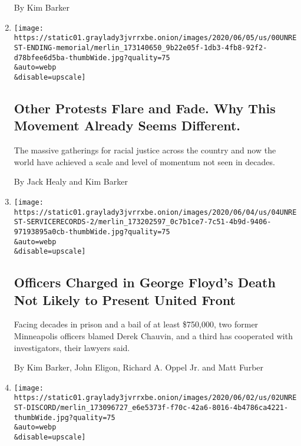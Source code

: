 \begin{enumerate}
  By Kim Barker
\item
  \href{/2020/06/07/us/unrest-protests-minneapolis-ending.html}{}

  \texttt{[image: https://static01.graylady3jvrrxbe.onion/images/2020/06/05/us/00UNREST-ENDING-memorial/merlin\_173140650\_9b22e05f-1db3-4fb8-92f2-d78bfee6d5ba-thumbWide.jpg?quality=75\\\&auto=webp\\\&disable=upscale]}

  \hypertarget{other-protests-flare-and-fade-why-this-movement-already-seems-different}{%
  \subsection{Other Protests Flare and Fade. Why This Movement Already
  Seems
  Different.}\label{other-protests-flare-and-fade-why-this-movement-already-seems-different}}

  The massive gatherings for racial justice across the country and now
  the world have achieved a scale and level of momentum not seen in
  decades.

  By Jack Healy and Kim Barker
\item
  \href{/2020/06/04/us/george-floyd-police-records-chauvin.html}{}

  \texttt{[image: https://static01.graylady3jvrrxbe.onion/images/2020/06/04/us/04UNREST-SERVICERECORDS-2/merlin\_173202597\_0c7b1ce7-7c51-4b9d-9406-97193895a0cb-thumbWide.jpg?quality=75\\\&auto=webp\\\&disable=upscale]}

  \hypertarget{officers-charged-in-george-floyds-death-not-likely-to-present-united-front}{%
  \subsection{Officers Charged in George Floyd's Death Not Likely to
  Present United
  Front}\label{officers-charged-in-george-floyds-death-not-likely-to-present-united-front}}

  Facing decades in prison and a bail of at least \$750,000, two former
  Minneapolis officers blamed Derek Chauvin, and a third has cooperated
  with investigators, their lawyers said.

  By Kim Barker, John Eligon, Richard A. Oppel Jr. and Matt Furber
\item
  \href{/2020/06/02/us/minneapolis-protests-conflict-discord.html}{}

  \texttt{[image: https://static01.graylady3jvrrxbe.onion/images/2020/06/02/us/02UNREST-DISCORD/merlin\_173096727\_e6e5373f-f70c-42a6-8016-4b4786ca4221-thumbWide.jpg?quality=75\\\&auto=webp\\\&disable=upscale]}


\end{enumerate}
